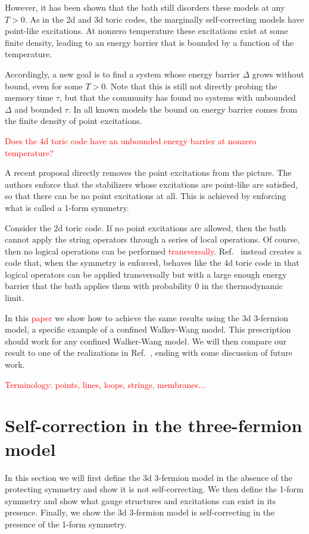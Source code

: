 \documentclass[twocolumn, longbibliography]{revtex4-2}
\newcommand{\note}[1]{\textcolor{red}{#1}}
\begin{document}
However, it has been shown that the bath still disorders these models at any $T>0$. As in the 2d and 3d toric codes, the marginally self-correcting models have point-like excitations. At nonzero temperature these excitations exist at some finite density, leading to an energy barrier that is bounded by a function of the temperature.
	
Accordingly, a new goal is to find a system whose energy barrier $\Delta$ grows without bound, even for some $T>0$. Note that this is still not directly probing the memory time $\tau$, but that the community has found no systems with unbounded $\Delta$ and bounded $\tau$. In all known models the bound on energy barrier comes from the finite density of point excitations.
	
\note{Does the 4d toric code have an unbounded energy barrier at nonzero temperature?} 
	
A recent proposal directly removes the point excitations from the picture. The authors enforce that the stabilizers whose excitations are point-like are satisfied, so that there can be no point excitations at all. This is achieved by enforcing what is called a 1-form symmetry.
	
Consider the 2d toric code. If no point excitations are allowed, then the bath cannot apply the string operators through a series of local operations. Of course, then no logical operations can be performed \note{transversally}. Ref.~\cite{RobertsBartlett} instead creates a code that, when the symmetry is enforced, behaves like the 4d toric code in that logical operators can be applied transversally but with a large enough energy barrier that the bath applies them with probability 0 in the thermodynamic limit.
	
In this \note{paper} we show how to achieve the same results using the 3d 3-fermion model, a specific example of a confined Walker-Wang model. This prescription should work for any confined Walker-Wang model. We will then compare our result to one of the realizations in Ref.~\cite{RobertsBartlett}, ending with some discussion of future work.
	
\note{Terminology: points, lines, loops, strings, membranes...}
	
\section{Self-correction in the three-fermion model}
	
In this section we will first define the 3d 3-fermion model in the absence of the protecting symmetry and show it is not self-correcting. We then define the 1-form symmetry and show what gauge structures and excitations can exist in its presence. Finally, we show the 3d 3-fermion model is self-correcting in the presence of the 1-form symmetry.
	
\end{document}
